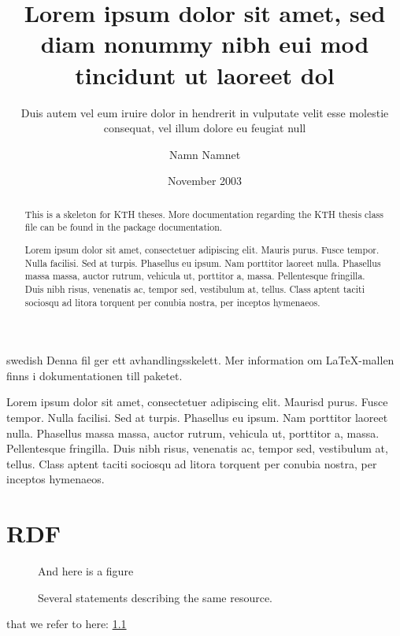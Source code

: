 \documentclass[a4paper,11pt]{kth-mag}
\title{Lorem ipsum dolor sit amet, sed diam nonummy nibh eui
       mod tincidunt ut laoreet dol}
\subtitle{Duis autem vel eum iruire dolor in hendrerit in
          vulputate velit esse molestie consequat, vel illum
          dolore eu feugiat null}
\author{Namn Namnet}
\date{November 2003}
\begin{document}
\frontmatter
\pagestyle{empty}
\removepagenumbers
\maketitle
{}

\begin{abstract}
  This is a skeleton for KTH theses. More documentation
  regarding the KTH thesis class file can be found in
  the package documentation.

Lorem ipsum dolor sit amet, consectetuer adipiscing elit. Mauris
purus. Fusce tempor. Nulla facilisi. Sed at turpis. Phasellus eu
ipsum. Nam porttitor laoreet nulla. Phasellus massa massa, auctor
rutrum, vehicula ut, porttitor a, massa. Pellentesque fringilla. Duis
nibh risus, venenatis ac, tempor sed, vestibulum at, tellus. Class
aptent taciti sociosqu ad litora torquent per conubia nostra, per
inceptos hymenaeos.
\end{abstract}

\clearpage

\begin{foreignabstract}{swedish}
  Denna fil ger ett avhandlingsskelett.
  Mer information om \LaTeX-mallen finns i
  dokumentationen till paketet.

Lorem ipsum dolor sit amet, consectetuer adipiscing elit. Maurisd
purus. Fusce tempor. Nulla facilisi. Sed at turpis. Phasellus eu
ipsum. Nam porttitor laoreet nulla. Phasellus massa massa, auctor
rutrum, vehicula ut, porttitor a, massa. Pellentesque fringilla. Duis
nibh risus, venenatis ac, tempor sed, vestibulum at, tellus. Class
aptent taciti sociosqu ad litora torquent per conubia nostra, per
inceptos hymenaeos.
\end{foreignabstract}
\clearpage
\tableofcontents*

\mainmatter
\pagestyle{newchap}




\newpage
\printbibliography

\newpage
\listoffigures

\newpage
\appendix
\addappheadtotoc
\chapter{RDF}\label{appA}

\begin{figure}[ht]
\begin{center}
And here is a figure
\caption{\small{Several statements describing the same resource.}}\label{RDF_4}
\end{center}
\end{figure}

that we refer to here: \ref{RDF_4}
\end{document}
